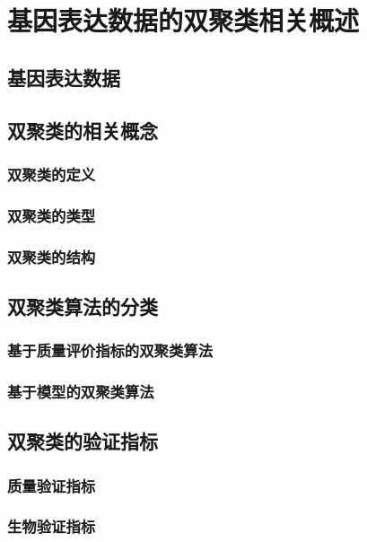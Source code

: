 \chapter{基因表达数据的双聚类相关概述}

\section{基因表达数据}

\section{双聚类的相关概念}

  \subsection{双聚类的定义}

  \subsection{双聚类的类型}

  \subsection{双聚类的结构}

\section{双聚类算法的分类}

  \subsection{基于质量评价指标的双聚类算法}

  \subsection{基于模型的双聚类算法}

  
\section{双聚类的验证指标}
  \subsection{质量验证指标}

  \subsection{生物验证指标}

